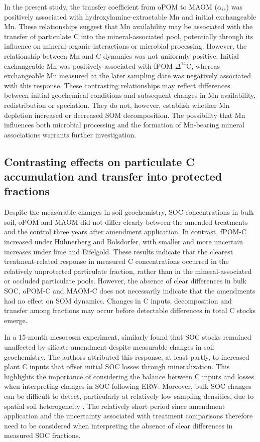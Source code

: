 \documentclass[preprint,12pt]{elsarticle}
\begin{document}
In the present study, the transfer coefficient from oPOM to MAOM ($\alpha_{is}$) was positively associated with hydroxylamine-extractable Mn and initial exchangeable Mn. These relationships suggest that Mn availability may be associated with the transfer of particulate C into the mineral-associated pool, potentially through its influence on mineral-organic interactions or microbial processing. However, the relationship between Mn and C dynamics was not uniformly positive. Initial exchangeable Mn was positively associated with fPOM $\Delta^{14}$C, whereas exchangeable Mn measured at the later sampling date was negatively associated with this response. These contrasting relationships may reflect differences between initial geochemical conditions and subsequent changes in Mn availability, redistribution or speciation. They do not, however, establish whether Mn depletion increased or decreased SOM decomposition. The possibility that Mn influences both microbial processing and the formation of Mn-bearing mineral associations warrants further investigation.

\subsection{Contrasting effects on particulate C accumulation and transfer into protected fractions}
\label{subsec:carbon_allocation}

Despite the measurable changes in soil geochemistry, SOC concentrations in bulk soil, oPOM and MAOM did not differ clearly between the amended treatments and the control three years after amendment application. In contrast, fPOM-C increased under Hühnerberg and Bolsdorfer, with smaller and more uncertain increases under lime and Eifelgold. These results indicate that the clearest treatment-related response in measured C concentrations occurred in the relatively unprotected particulate fraction, rather than in the mineral-associated or occluded particulate pools. However, the absence of clear differences in bulk SOC, oPOM-C and MAOM-C does not necessarily indicate that the amendments had no effect on SOM dynamics. Changes in C inputs, decomposition and transfer among fractions may occur before detectable differences in total C stocks emerge.

In a 15-month mesocosm experiment, \citep{steinwidder2025beyond} similarly found that SOC stocks remained unaffected by silicate amendment despite measurable changes in soil geochemistry. The authors attributed this response, at least partly, to increased plant C inputs that offset initial SOC losses through mineralization. This highlights the importance of considering the balance between C inputs and losses when interpreting changes in SOC following ERW. Moreover, bulk SOC changes can be difficult to detect, particularly at relatively low sampling densities, due to spatial soil heterogeneity \citep{Poeplau2022,steinwidder2025beyond}. The relatively short period since amendment application and the uncertainty associated with treatment comparisons therefore need to be considered when interpreting the absence of clear differences in measured SOC fractions.
\end{document}
